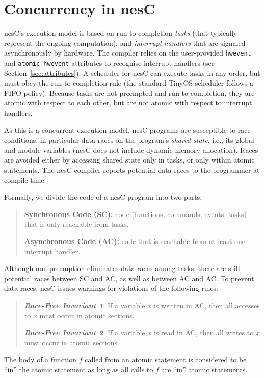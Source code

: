 \documentclass[11pt,letterpaper]{article}
\newcommand{\code}[1]{{\tt #1}}
\newcommand{\nesc}{nesC\xspace}
\newcommand{\tinyos}{TinyOS\xspace}
\begin{document}
\section{Concurrency in \nesc}
\label{sec:concurrency}

\nesc's execution model is based on run-to-completion
\emph{tasks} (that typically represent the ongoing computation), and
\emph{interrupt handlers} that are signaled asynchronously by hardware. The
compiler relies on the user-provided \code{hwevent} and
\code{atomic\_hwevent} attributes to recognise interrupt handlers (see
Section~\ref{sec:attributes}).  A scheduler for \nesc can execute tasks in
any order, but must obey the run-to-completion rule (the standard \tinyos
scheduler follows a FIFO policy). Because tasks are not preempted and run
to completion, they are atomic with respect to each other, but are not
atomic with respect to interrupt handlers.

As this is a concurrent execution model, \nesc programs are susceptible to
race conditions, in particular data races on the program's \emph{shared
state}, i.e., its global and module variables (\nesc does not include
dynamic memory allocation). Races are avoided either by accessing
shared state only in tasks, or only within atomic statements. The \nesc
compiler reports potential data races to the programmer at compile-time.

Formally, we divide the code of a \nesc program into two parts:
\begin{quote}
\textbf{Synchronous Code (SC):} code (functions, commands, events, tasks)
that is only reachable from tasks.

\textbf{Asynchronous Code (AC):} code that is reachable from at 
least one interrupt handler.
\end{quote}

Although non-preemption eliminates data races among tasks, there are still
potential races between SC and AC, as well as between AC and AC. To
prevent data races, \nesc issues warnings for violations of the following
rules:
\begin{quote}
{\sl {\bf Race-Free Invariant 1}}: If a variable $x$ is written in AC, then 
all accesses to $x$ must occur in atomic sections.

{\sl {\bf Race-Free Invariant 2}}: If a variable $x$ is read in AC, then 
all writes to $x$ must occur in atomic sections.
\end{quote}
The body of a function $f$ called from an atomic statement is considered to
be ``in'' the atomic statement as long as all calls to $f$ are ``in''
atomic statements.
\end{document}
